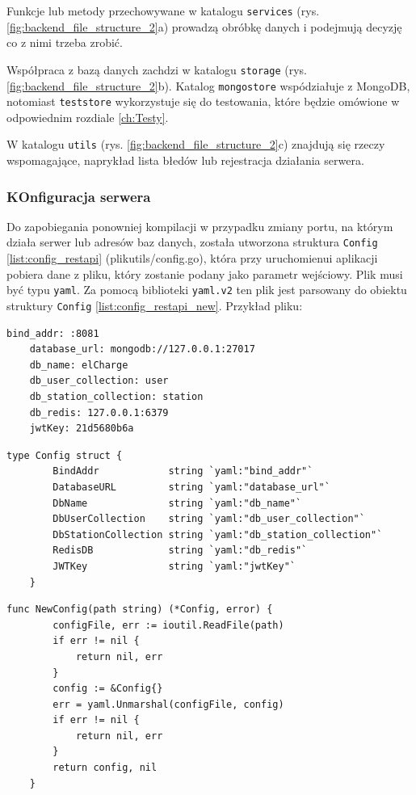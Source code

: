 Funkcje lub metody przechowywane w katalogu \texttt{services} (rys. \ref{fig:backend_file_structure_2}a) prowadzą obróbkę danych i podejmują decyzję co z nimi trzeba zrobić.

Współpraca z bazą danych zachdzi w katalogu \texttt{storage} (rys. \ref{fig:backend_file_structure_2}b). Katalog \texttt{mongostore} wspódziałuje z MongoDB, notomiast \texttt{teststore} wykorzystuje się do testowania, które będzie omówione w odpowiednim rozdiale \ref{ch:Testy}.

W katalogu \texttt{utils} (rys. \ref{fig:backend_file_structure_2}c) znajdują się rzeczy wspomagające, naprykład lista błedów lub rejestracja działania serwera.


\subsubsection{KOnfiguracja serwera}
Do zapobiegania ponowniej kompilacji w przypadku zmiany portu, na którym działa serwer lub adresów baz danych, została utworzona struktura \texttt{Config} \ref{list:config_restapi} (plikutils/config.go), która przy uruchomienui aplikacji pobiera dane z pliku, który zostanie podany jako parametr wejściowy.
Plik musi być typu \texttt{yaml}. Za pomocą biblioteki \texttt{yaml.v2} ten plik jest parsowany do obiektu struktury \texttt{Config} \ref{list:config_restapi_new}. Przykład pliku:
\begin{lstlisting}[basicstyle=\tiny\ttfamily]
    bind_addr: :8081
    database_url: mongodb://127.0.0.1:27017
    db_name: elCharge
    db_user_collection: user
    db_station_collection: station
    db_redis: 127.0.0.1:6379
    jwtKey: 21d5680b6a
\end{lstlisting}

\begin{lstlisting}[label=list:config_restapi,caption=Klasa konfiguracyjna części serwerowej,basicstyle=\tiny\ttfamily]
    type Config struct {
        BindAddr            string `yaml:"bind_addr"`
        DatabaseURL         string `yaml:"database_url"`
        DbName              string `yaml:"db_name"`
        DbUserCollection    string `yaml:"db_user_collection"`
        DbStationCollection string `yaml:"db_station_collection"`
        RedisDB             string `yaml:"db_redis"`
        JWTKey              string `yaml:"jwtKey"`
    }
\end{lstlisting}

\begin{lstlisting}[label=list:config_restapi_new,caption=Wczytanie pliku konfiguracyjnego części serwerowej,basicstyle=\tiny\ttfamily]
    func NewConfig(path string) (*Config, error) {
        configFile, err := ioutil.ReadFile(path)
        if err != nil {
            return nil, err
        }
        config := &Config{}
        err = yaml.Unmarshal(configFile, config)
        if err != nil {
            return nil, err
        }
        return config, nil
    }
\end{lstlisting}
% 
